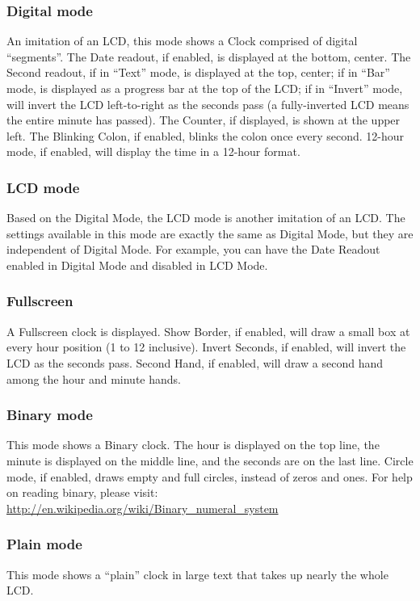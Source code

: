 \subsubsection{Digital mode}
An imitation of an LCD, this mode shows a Clock comprised of digital ``segments''.
The Date readout, if enabled, is displayed at the bottom, center.
The Second readout, if in ``Text'' mode, is displayed at the top, center; if in
``Bar'' mode, is displayed as a progress bar at the top of the LCD; if in
``Invert'' mode, will invert the LCD left-to-right as the seconds pass (a
fully-inverted LCD means the entire minute has passed).
The Counter, if displayed, is shown at the upper left.
The Blinking Colon, if enabled, blinks the colon once every second.
12-hour mode, if enabled, will display the time in a 12-hour format.

\subsubsection{LCD mode}
Based on the Digital Mode, the LCD mode is another imitation of an LCD.
The settings available in this mode are exactly the same as Digital Mode, but
they are independent of Digital Mode. For example, you can have the Date
Readout enabled in Digital Mode and disabled in LCD Mode.

\subsubsection{Fullscreen}
A Fullscreen clock is displayed. Show Border, if enabled, will draw a small
box at every hour position (1 to 12 inclusive).
Invert Seconds, if enabled, will invert the LCD as the seconds pass.
Second Hand, if enabled, will draw a second hand among the hour and minute hands.

\subsubsection{Binary mode}
This mode shows a Binary clock.
The hour is displayed on the top line, the minute is displayed on the middle
line, and the seconds are on the last line.
Circle mode, if enabled, draws empty and full circles, instead of zeros and ones.
For help on reading binary, please visit:
\url{http://en.wikipedia.org/wiki/Binary_numeral_system}

\subsubsection{Plain mode}
This mode shows a ``plain'' clock in large text that takes up nearly the whole LCD.